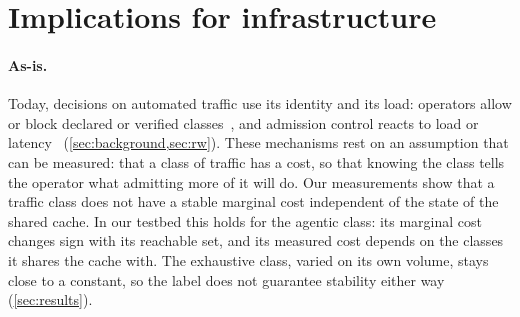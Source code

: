 \section{Implications for infrastructure}\label{sec:implications}
\paragraph{As-is.}
Today, decisions on automated traffic use its identity and its load: operators allow or
block declared or verified classes~\cite{cloudflare2026options,ietf-webbotauth}, and
admission control reacts to load or
latency~\cite{cho2020breakwater,zhou2018dagor,cho2023protego,park2024topfull}
(\cref{sec:background,sec:rw}).
These mechanisms rest on an assumption that can be measured: that a class of traffic has a
cost, so that knowing the class tells the operator what admitting more of it will
do.
Our measurements show that a traffic class does not have a stable marginal cost
independent of the state of the shared cache.
In our testbed this holds for the agentic class: its marginal cost changes sign with its
reachable set, and its measured cost depends on the classes it shares the cache with.
The exhaustive class, varied on its own volume, stays close to a constant, so the label does
not guarantee stability either way (\cref{sec:results}).

